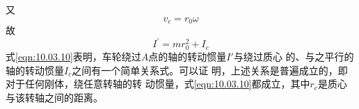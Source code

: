 又\vspace{-1.56em}
\begin{equation*}
    v _ { c } = r _ { 0 } \omega
\end{equation*}
故\vspace{-1.56em}
\begin{equation}\label{eqn:10.03.10}
    I ^ { \prime } = m r _ 0 ^ { 2 } + I _ { c }
\end{equation}
式\eqref{eqn:10.03.10}表明，\!车轮绕过$ A $点的轴的转动惯量$ I' $与绕过质心
的、\!与之平行的轴的转动惯量$ I _ c $之间有一个简单关系式。\!可以证
明，\!上述关系是普遍成立的，\!即对于任何刚体，\!绕任意转轴的转
动惯量，\!式\eqref{eqn:10.03.10}都成立，其中$ r _ c $是质心与该转轴之间的距离。

